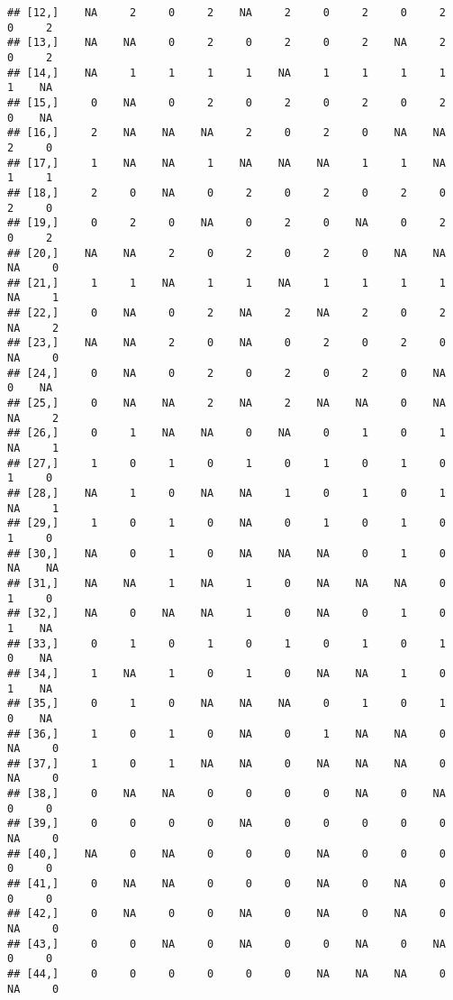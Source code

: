 \documentclass[
]{article}
\begin{document}
\begin{verbatim}
## [12,]    NA     2     0     2    NA     2     0     2     0     2     0     2
## [13,]    NA    NA     0     2     0     2     0     2    NA     2     0     2
## [14,]    NA     1     1     1     1    NA     1     1     1     1     1    NA
## [15,]     0    NA     0     2     0     2     0     2     0     2     0    NA
## [16,]     2    NA    NA    NA     2     0     2     0    NA    NA     2     0
## [17,]     1    NA    NA     1    NA    NA    NA     1     1    NA     1     1
## [18,]     2     0    NA     0     2     0     2     0     2     0     2     0
## [19,]     0     2     0    NA     0     2     0    NA     0     2     0     2
## [20,]    NA    NA     2     0     2     0     2     0    NA    NA    NA     0
## [21,]     1     1    NA     1     1    NA     1     1     1     1    NA     1
## [22,]     0    NA     0     2    NA     2    NA     2     0     2    NA     2
## [23,]    NA    NA     2     0    NA     0     2     0     2     0    NA     0
## [24,]     0    NA     0     2     0     2     0     2     0    NA     0    NA
## [25,]     0    NA    NA     2    NA     2    NA    NA     0    NA    NA     2
## [26,]     0     1    NA    NA     0    NA     0     1     0     1    NA     1
## [27,]     1     0     1     0     1     0     1     0     1     0     1     0
## [28,]    NA     1     0    NA    NA     1     0     1     0     1    NA     1
## [29,]     1     0     1     0    NA     0     1     0     1     0     1     0
## [30,]    NA     0     1     0    NA    NA    NA     0     1     0    NA    NA
## [31,]    NA    NA     1    NA     1     0    NA    NA    NA     0     1     0
## [32,]    NA     0    NA    NA     1     0    NA     0     1     0     1    NA
## [33,]     0     1     0     1     0     1     0     1     0     1     0    NA
## [34,]     1    NA     1     0     1     0    NA    NA     1     0     1    NA
## [35,]     0     1     0    NA    NA    NA     0     1     0     1     0    NA
## [36,]     1     0     1     0    NA     0     1    NA    NA     0    NA     0
## [37,]     1     0     1    NA    NA     0    NA    NA    NA     0    NA     0
## [38,]     0    NA    NA     0     0     0     0    NA     0    NA     0     0
## [39,]     0     0     0     0    NA     0     0     0     0     0    NA     0
## [40,]    NA     0    NA     0     0     0    NA     0     0     0     0     0
## [41,]     0    NA    NA     0     0     0    NA     0    NA     0     0     0
## [42,]     0    NA     0     0    NA     0    NA     0    NA     0    NA     0
## [43,]     0     0    NA     0    NA     0     0    NA     0    NA     0     0
## [44,]     0     0     0     0     0     0    NA    NA    NA     0    NA     0

\end{verbatim}
\end{document}
